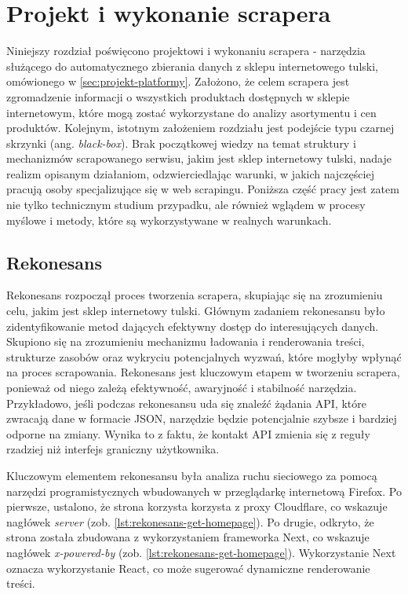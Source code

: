 \newpage


\section{Projekt i wykonanie scrapera}\label{sec:projekt-scrapera}

Niniejszy rozdział poświęcono projektowi i wykonaniu scrapera - narzędzia służącego do automatycznego zbierania danych z sklepu internetowego tulski, omówionego w \autoref{sec:projekt-platformy}.
Założono, że celem scrapera jest zgromadzenie informacji o wszystkich produktach dostępnych w sklepie internetowym, które mogą zostać wykorzystane do analizy asortymentu i cen produktów.
Kolejnym, istotnym założeniem rozdziału jest podejście typu czarnej skrzynki (ang. \emph{black-box})\cite{sekurak-testy-penetracyjne}.
Brak początkowej wiedzy na temat struktury i mechanizmów scrapowanego serwisu, jakim jest sklep internetowy tulski, nadaje realizm opisanym działaniom, odzwierciedlając warunki, w jakich najczęściej pracują osoby specjalizujące się w web scrapingu.
Poniższa część pracy jest zatem nie tylko technicznym studium przypadku, ale również wglądem w procesy myślowe i metody, które są wykorzystywane w realnych warunkach.

\subsection{Rekonesans}\label{subsec:rekonesans}

Rekonesans rozpoczął proces tworzenia scrapera, skupiając się na zrozumieniu celu, jakim jest sklep internetowy tulski.
Głównym zadaniem rekonesansu było zidentyfikowanie metod dających efektywny dostęp do interesujących danych.
Skupiono się na zrozumieniu mechanizmu ładowania i renderowania treści, strukturze zasobów oraz wykryciu potencjalnych wyzwań, które mogłyby wpłynąć na proces scrapowania.
Rekonesans jest kluczowym etapem w tworzeniu scrapera, ponieważ od niego zależą efektywność, awaryjność i stabilność narzędzia.
Przykładowo, jeśli podczas rekonesansu uda się znaleźć żądania API, które zwracają dane w formacie JSON, narzędzie będzie potencjalnie szybsze i bardziej odporne na zmiany.
Wynika to z faktu, że kontakt API zmienia się z reguły rzadziej niż interfejs graniczny użytkownika.

Kluczowym elementem rekonesansu była analiza ruchu sieciowego za pomocą narzędzi programistycznych wbudowanych w przeglądarkę internetową Firefox.
Po pierwsze, ustalono, że strona korzysta korzysta z proxy Cloudflare, co wskazuje nagłówek \emph{server} (zob. \autoref{lst:rekonesans-get-homepage}).
Po drugie, odkryto, że strona została zbudowana z wykorzystaniem frameworka Next, co wskazuje nagłówek \emph{x-powered-by} (zob. \autoref{lst:rekonesans-get-homepage}).
Wykorzystanie Next oznacza wykorzystanie React, co może sugerować dynamiczne renderowanie treści.

